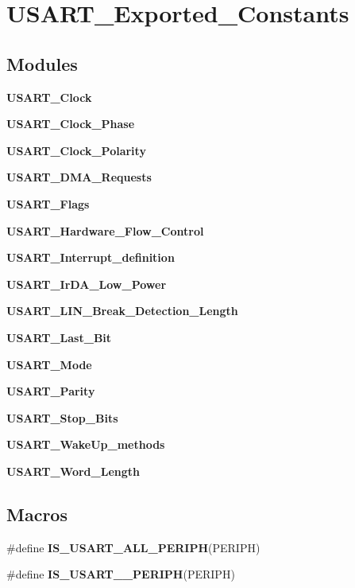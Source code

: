 \section{U\+S\+A\+R\+T\+\_\+\+Exported\+\_\+\+Constants}
\label{group__USART__Exported__Constants}
\subsection*{Modules}
\begin{DoxyCompactItemize}
\item 
\textbf{ U\+S\+A\+R\+T\+\_\+\+Clock}
\item 
\textbf{ U\+S\+A\+R\+T\+\_\+\+Clock\+\_\+\+Phase}
\item 
\textbf{ U\+S\+A\+R\+T\+\_\+\+Clock\+\_\+\+Polarity}
\item 
\textbf{ U\+S\+A\+R\+T\+\_\+\+D\+M\+A\+\_\+\+Requests}
\item 
\textbf{ U\+S\+A\+R\+T\+\_\+\+Flags}
\item 
\textbf{ U\+S\+A\+R\+T\+\_\+\+Hardware\+\_\+\+Flow\+\_\+\+Control}
\item 
\textbf{ U\+S\+A\+R\+T\+\_\+\+Interrupt\+\_\+definition}
\item 
\textbf{ U\+S\+A\+R\+T\+\_\+\+Ir\+D\+A\+\_\+\+Low\+\_\+\+Power}
\item 
\textbf{ U\+S\+A\+R\+T\+\_\+\+L\+I\+N\+\_\+\+Break\+\_\+\+Detection\+\_\+\+Length}
\item 
\textbf{ U\+S\+A\+R\+T\+\_\+\+Last\+\_\+\+Bit}
\item 
\textbf{ U\+S\+A\+R\+T\+\_\+\+Mode}
\item 
\textbf{ U\+S\+A\+R\+T\+\_\+\+Parity}
\item 
\textbf{ U\+S\+A\+R\+T\+\_\+\+Stop\+\_\+\+Bits}
\item 
\textbf{ U\+S\+A\+R\+T\+\_\+\+Wake\+Up\+\_\+methods}
\item 
\textbf{ U\+S\+A\+R\+T\+\_\+\+Word\+\_\+\+Length}
\end{DoxyCompactItemize}
\subsection*{Macros}
\begin{DoxyCompactItemize}
\item 
\#define \textbf{ I\+S\+\_\+\+U\+S\+A\+R\+T\+\_\+\+A\+L\+L\+\_\+\+P\+E\+R\+I\+PH}(P\+E\+R\+I\+PH)
\item 
\#define \textbf{ I\+S\+\_\+\+U\+S\+A\+R\+T\+\_\+\_\+\+P\+E\+R\+I\+PH}(P\+E\+R\+I\+PH)
\end{DoxyCompactItemize}


